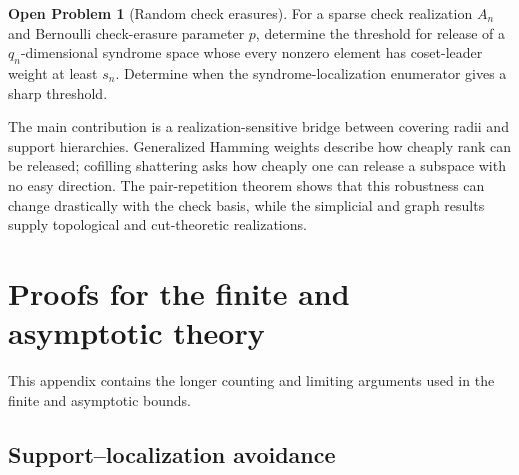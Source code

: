 \documentclass[11pt,letterpaper]{article}
\theoremstyle{plain}
\theoremstyle{definition}
\newtheorem{openproblem}[theorem]{Open Problem}
\newcommand{\1}{\mathbf{1}}
\begin{document}
\begin{openproblem}[Random check erasures]
For a sparse check realization $A_n$ and Bernoulli check-erasure parameter
$p$, determine the threshold for release of a $q_n$-dimensional syndrome
space whose every nonzero element has coset-leader weight at least $s_n$.
Determine when the syndrome-localization enumerator gives a sharp threshold.
\end{openproblem}

The main contribution is a realization-sensitive bridge between covering
radii and support hierarchies.  Generalized Hamming weights describe how
cheaply rank can be released; cofilling shattering asks how cheaply one can
release a subspace with no easy direction.  The pair-repetition theorem shows
that this robustness can change drastically with the check basis, while the
simplicial and graph results supply topological and cut-theoretic
realizations.


\appendix

\section{Proofs for the finite and asymptotic theory}
\label{app:finite-proofs}

This appendix contains the longer counting and limiting arguments used in the finite
and asymptotic bounds.

\subsection{Support--localization avoidance}
\label{app:localized-existence}
\end{document}
